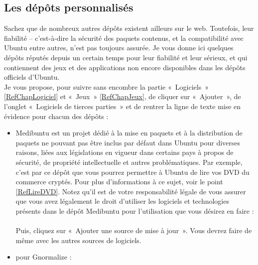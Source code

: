{\subsection{Les dépôts personnalisés}	
Sachez que de nombreux autres dépôts existent ailleurs sur le web. Toutefois, leur fiabilité -- c'est-à-dire la sécurité des paquets contenus, et la compatibilité avec Ubuntu entre autres, n'est pas toujours assurée. Je vous donne ici quelques dépôts réputés depuis un certain temps pour leur fiabilité et leur sérieux, et qui contiennent des jeux et des applications non encore disponibles dans les dépôts officiels d'Ubuntu.\\
Je vous propose, pour suivre sans encombre la partie «~Logiciels~» \ref{RefChapLogiciel} et «~Jeux~» \ref{RefChapJeux}, de cliquer sur «~Ajouter~», de l'onglet «~Logiciels de tierces parties~» et de rentrer la ligne de texte mise en évidence pour chacun des dépôts :
\begin{itemize}
\item Medibuntu est un projet dédié à la mise en paquets et à la distribution de paquets ne pouvant pas être inclus par défaut dans Ubuntu pour diverses raisons, liées aux législations en vigueur dans certains pays à propos de sécurité, de propriété intellectuelle et autres problématiques. Par exemple, c'est par ce dépôt que vous pourrez permettre à Ubuntu de lire vos DVD du commerce cryptés. Pour plus d'informations à ce sujet, voir le point \ref{RefLireDVD}. Notez qu'il est de votre responsabilité légale de vous assurer que vous avez légalement le droit d'utiliser les logiciels et technologies présents dans le dépôt Medibuntu pour l'utilisation que vous désirez en faire :\\
\\
Puis, cliquez sur «~Ajouter une source de mise à jour~». Vous devrez faire de même avec les autres sources de logiciels.\par
\item pour Gnormalize :\\
\par
\end{itemize}\par
}
